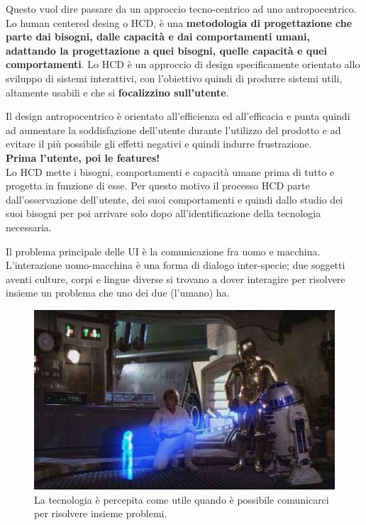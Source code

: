 Questo vuol dire passare da un approccio tecno-centrico ad uno antropocentrico. Lo human centered desing o HCD, è una \textbf{metodologia di progettazione che parte dai bisogni, dalle capacità e dai comportamenti umani, adattando la progettazione a quei bisogni, quelle capacità e quei comportamenti}. Lo HCD è un approccio di design specificamente orientato allo sviluppo di sistemi interattivi, con l'obiettivo quindi di produrre sistemi utili, altamente usabili e che si \textbf{focalizzino sull'utente}.

Il design antropocentrico è orientato all'efficienza ed all'efficacia e punta quindi ad aumentare la soddisfazione dell'utente durante l'utilizzo del prodotto e ad evitare il più possibile gli effetti negativi e quindi indurre frustrazione.\\

\textbf{Prima l'utente, poi le features!} \\

Lo HCD mette i bisogni, comportamenti e capacità umane prima di tutto e progetta in funzione di esse. Per questo motivo il processo HCD parte dall'osservazione dell'utente, dei suoi comportamenti e quindi dallo studio dei suoi bisogni per poi arrivare solo dopo all'identificazione della tecnologia necessaria.

Il problema principale delle UI è la comunicazione fra uomo e macchina. L'interazione uomo-macchina è una forma di dialogo inter-specie; due soggetti aventi culture, corpi e lingue diverse si trovano a dover interagire per risolvere insieme un problema che uno dei due (l'umano) ha. 

\begin{figure}[!h]
	\centering
	\includegraphics[width=\textwidth]{immagini/starwars.jpg}
	\caption{La tecnologia è percepita come utile quando è possibile comunicarci per risolvere insieme problemi.}
\end{figure}

